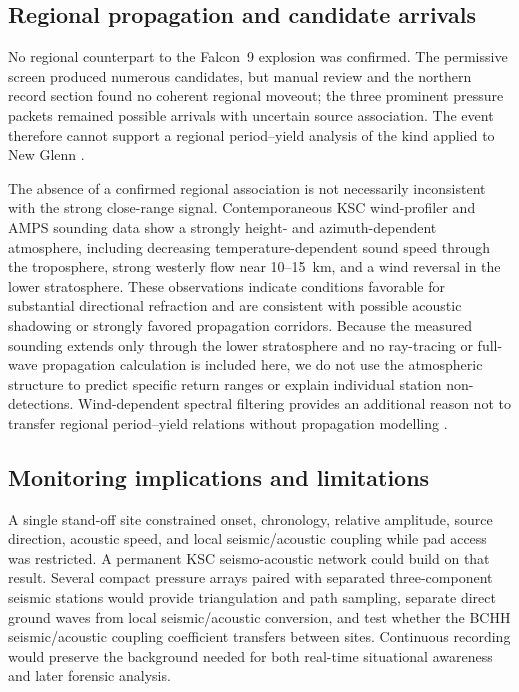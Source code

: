 \documentclass[]{seismica}
\begin{document}
\subsection{Regional propagation and candidate arrivals}

No regional counterpart to the Falcon~9 explosion was confirmed. The
permissive screen produced numerous candidates, but manual review and the
northern record section found no coherent regional moveout; the three
prominent pressure packets remained possible arrivals with uncertain source 
association. The event therefore cannot support a regional period--yield analysis 
of the kind applied to New Glenn \citep{silber_scamfer_newglenn_2026}.

The absence of a confirmed regional association is not necessarily inconsistent with the strong
close-range signal. Contemporaneous KSC wind-profiler and AMPS sounding data
show a strongly height- and azimuth-dependent atmosphere, including decreasing
temperature-dependent sound speed through the troposphere, strong westerly
flow near 10--15~km, and a wind reversal in the lower stratosphere. These
observations indicate conditions favorable for substantial directional
refraction and are consistent with possible acoustic shadowing or strongly
favored propagation corridors. Because the measured sounding extends only
through the lower stratosphere and no ray-tracing or full-wave propagation
calculation is included here, we do not use the atmospheric structure to
predict specific return ranges or explain individual station
non-detections. Wind-dependent spectral filtering provides an additional
reason not to transfer regional period--yield relations without propagation
modelling \citep{silber_wind_filtering_2026}.

\subsection{Monitoring implications and limitations}

A single stand-off site constrained onset, chronology, relative amplitude,
source direction, acoustic speed, and local seismic/acoustic coupling while pad
access was restricted. A permanent KSC seismo-acoustic network could build on
that result. Several compact pressure arrays paired with separated
three-component seismic stations would provide triangulation and path sampling,
separate direct ground waves from local seismic/acoustic conversion, and test
whether the BCHH seismic/acoustic coupling coefficient transfers between sites. Continuous
recording would preserve the background needed for both real-time situational
awareness and later forensic analysis.
\end{document}
